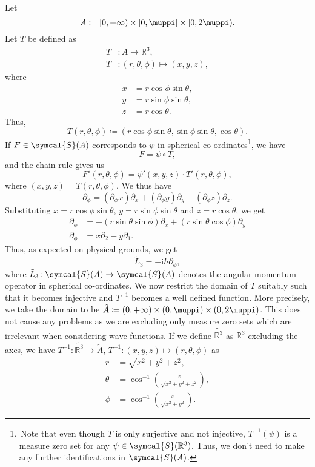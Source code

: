 \documentclass[12pt, a4 paper]{article}
\theoremstyle{definition}
\newcommand{\rthree}{\mathbb{R}^3}
\newcommand{\rr}{\mathbb{R}}
\newcommand{\schwartz}{\symcal{S}}
\newcommand{\schwartzrthree}{\schwartz(\rr^3)}
\renewcommand{\i}{\mathrm{i}}
\renewcommand{\pi}{\muppi}
\begin{document}
	Let
	\[
	    A \coloneq [0, +\infty) \times [0,\pi] \times [0,2\pi).
	\]
	Let $T$ be defined as
	\begin{align*}
		T &\colon A \rightarrow \rthree,\\
		T &\colon (r, \theta, \phi) \mapsto (x, y, z),
	\end{align*}
	where
	\begin{align*}
		x &= r \cos{\phi} \sin{\theta},\\
		y &= r \sin{\phi} \sin{\theta},\\
		z &= r \cos{\theta}.
	\end{align*}
	Thus,
	\[
	    T(r, \theta, \phi) \coloneq (r \cos{\phi} \sin{\theta}, \sin{\phi} \sin{\theta}, \cos{\theta}).
	\]
	If $F \in \schwartz(A)$ corresponds to $\psi$ in spherical co-ordinates\footnote{\,Note that even though $T$ is only surjective and not injective, $T^{-1}(\psi)$ is a measure zero set for any $\psi \in \schwartzrthree$. Thus, we don't need to make any further identifications in $\schwartz(A)$.}, we have
	\[
		F = \psi \circ T,
	\]
	and the chain rule gives us
	\[
	    F'(r, \theta, \phi) = \psi'(x,y,z) \cdot T'(r, \theta, \phi),
	\]
	where $(x,y,z) = T(r, \theta, \phi)$. We thus have
	\[
	    \partial_\phi = (\partial_\phi x)\partial_x + (\partial_\phi y)\partial_y + (\partial_\phi z)\partial_z.
	\]
	Substituting $x = r \cos{\phi} \sin{\theta}$, $y = r \sin{\phi} \sin{\theta}$ and $z = r \cos{\theta}$, we get
	\begin{align*}
		\partial_\phi &= -(r \sin{\theta} \sin{\phi})\partial_x + (r \sin{\theta} \cos{\phi})\partial_y\\
		\partial_\phi &= x\partial_2 - y\partial_1.
	\end{align*}
	Thus, as expected on physical grounds, we get
	\[
		\tilde{L}_3 = -\i\hbar\partial_\phi,
	\]
	where $\tilde{L}_3 \colon \schwartz(A) \rightarrow \schwartz(A)$ denotes the angular momentum operator in spherical co-ordinates.
	We now restrict the domain of $T$ suitably such that it becomes injective and $T^{-1}$ becomes a well defined function. More precisely, we take the domain to be $\tilde{A} \coloneq (0, +\infty) \times (0,\pi) \times (0,2\pi)$. This does not cause any problems as we are excluding only measure zero sets which are irrelevant when considering wave-functions. If we define $\tilde{\rthree}$ as $\rthree$ excluding the axes, we have $T^{-1} \colon \tilde{\rthree} \rightarrow \tilde{A}$, $T^{-1} \colon (x, y, z) \mapsto (r, \theta, \phi)$ as
	\begin{align*}
		r      &= \sqrt{x^2 + y^2 + z^2},\\
		\theta &= \cos^{-1}{\left(\frac{z}{\sqrt{x^2 + y^2 + z^2}}\right)},\\
		\phi   &= \cos^{-1}{\left(\frac{x}{\sqrt{x^2 + y^2}}\right)}.
	\end{align*}
\end{document}
